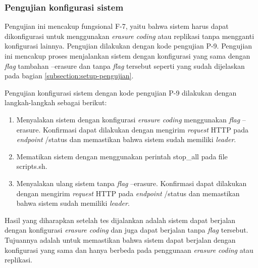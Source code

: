 \subsubsection{Pengujian konfigurasi sistem}
\label{subsubsection:pengujian-konfigurasi-sistem}

Pengujian ini mencakup fungsional F-7, yaitu bahwa sistem harus dapat dikonfigurasi untuk menggunakan \textit{erasure coding} atau replikasi tanpa mengganti konfigurasi lainnya. Pengujian dilakukan dengan kode pengujian P-9. Pengujian ini mencakup proses menjalankan sistem dengan konfigurasi yang sama dengan \textit{flag} tambahan --erasure dan tanpa \textit{flag} tersebut seperti yang sudah dijelaskan pada bagian \ref{subsection:setup-pengujian}.

Pengujian konfigurasi sistem dengan kode pengujian P-9 dilakukan dengan langkah-langkah sebagai berikut:
\begin{enumerate}
  \item Menyalakan sistem dengan konfigurasi \textit{erasure coding} menggunakan \textit{flag} --erasure. Konfirmasi dapat dilakukan dengan mengirim \textit{request} HTTP pada \textit{endpoint} /status dan memastikan bahwa sistem sudah memiliki \textit{leader}.
  \item Mematikan sistem dengan menggunakan perintah stop\_all pada file scripts.sh.
  \item Menyalakan ulang sistem tanpa \textit{flag} --erasure. Konfirmasi dapat dilakukan dengan mengirim \textit{request} HTTP pada \textit{endpoint} /status dan memastikan bahwa sistem sudah memiliki \textit{leader}.
\end{enumerate}

Hasil yang diharapkan setelah tes dijalankan adalah sistem dapat berjalan dengan konfigurasi \textit{erasure coding} dan juga dapat berjalan tanpa \textit{flag} tersebut. Tujuannya adalah untuk memastikan bahwa sistem dapat berjalan dengan konfigurasi yang sama dan hanya berbeda pada penggunaan \textit{erasure coding} atau replikasi.